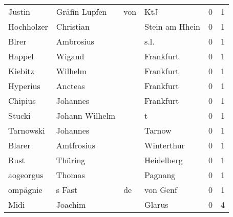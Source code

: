 \begin{tabular}{llllrr}
                   Justin &                     Gräfin  Lupfen &         von &                                         KtJ &          0 &         1 \\
               Hochholzer &                          Christian &             &                              Stein am Hhein &          0 &         1 \\
                    Blrer &                          Ambrosius &             &                                        s.l. &          0 &         1 \\
                   Happel &                             Wigand &             &                                   Frankfurt &          0 &         1 \\
                  Kiebitz &                            Wilhelm &             &                                   Frankfurt &          0 &         1 \\
                 Hyperius &                            Ancteas &             &                                   Frankfurt &          0 &         1 \\
                  Chipius &                           Johannes &             &                                   Frankfurt &          0 &         1 \\
                   Stucki &                     Johann Wilhelm &             &                                           t &          0 &         1 \\
                Tarnowski &                           Johannes &             &                                      Tarnow &          0 &         1 \\
                   Blarer &                         Amtfrosius &             &                                  Winterthur &          0 &         1 \\
                     Rust &                            Thüring &             &                                  Heidelberg &          0 &         1 \\
                aogeorgus &                             Thomas &             &                                     Pagnang &          0 &         1 \\
                 ompägnie &                             s Fast &          de &                                    von Genf &          0 &         1 \\
                     Midi &                            Joachim &             &                                      Glarus &          0 &         4 \\

\end{tabular}
